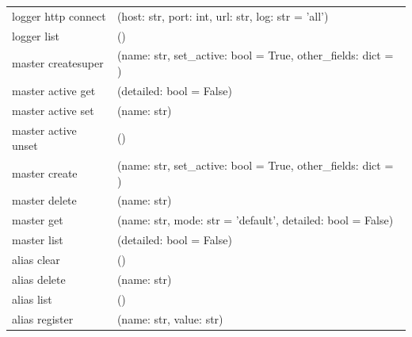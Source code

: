 {\begin{longtable}{l p{10cm}}
        logger http connect    & (host: str, port: int, url: str, log: str = 'all')                                                                    \\
        logger list            & ()                                                                                                                    \\
        master createsuper     & (name: str, set\_active: bool = True, other\_fields: dict = {})                                                       \\
        master active get      & (detailed: bool = False)                                                                                              \\
        master active set      & (name: str)                                                                                                           \\
        master active unset    & ()                                                                                                                    \\
        master create          & (name: str, set\_active: bool = True, other\_fields: dict = {})                                                       \\
        master delete          & (name: str)                                                                                                           \\
        master get             & (name: str, mode: str = 'default', detailed: bool = False)                                                            \\
        master list            & (detailed: bool = False)                                                                                              \\
        alias clear            & ()                                                                                                                    \\
        alias delete           & (name: str)                                                                                                           \\
        alias list             & ()                                                                                                                    \\
        alias register         & (name: str, value: str)                                                                                               \\

\end{longtable}}
